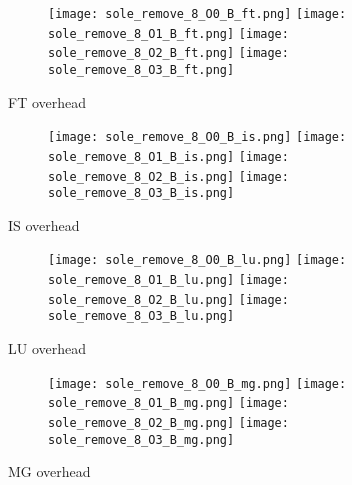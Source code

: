 \documentclass[11pt]{article}
\begin{document}
    \begin{figure}[!htb]
        \begin{subfigure}{\linewidth}
            \texttt{[image: sole\_remove\_8\_O0\_B\_ft.png]}
            \texttt{[image: sole\_remove\_8\_O1\_B\_ft.png]}
            \texttt{[image: sole\_remove\_8\_O2\_B\_ft.png]}
            \texttt{[image: sole\_remove\_8\_O3\_B\_ft.png]}
        \end{subfigure}\par\medskip
        \caption{FT overhead}
    \end{figure}
\begin{figure}[!htb]
        \begin{subfigure}{\linewidth}
            \texttt{[image: sole\_remove\_8\_O0\_B\_is.png]}\hfill
            \texttt{[image: sole\_remove\_8\_O1\_B\_is.png]}\hfill
            \texttt{[image: sole\_remove\_8\_O2\_B\_is.png]}\hfill
            \texttt{[image: sole\_remove\_8\_O3\_B\_is.png]}\hfill
        \end{subfigure}\par\medskip
        \caption{IS overhead}
\end{figure}

    \begin{figure}[!htb]
        \begin{subfigure}{\linewidth}
            \texttt{[image: sole\_remove\_8\_O0\_B\_lu.png]}\hfill
            \texttt{[image: sole\_remove\_8\_O1\_B\_lu.png]}\hfill
            \texttt{[image: sole\_remove\_8\_O2\_B\_lu.png]}\hfill
            \texttt{[image: sole\_remove\_8\_O3\_B\_lu.png]}\hfill
        \end{subfigure}\par\medskip
        \caption{LU overhead}
    \end{figure}

    \begin{figure}[!htb]
        \begin{subfigure}{\linewidth}
            \texttt{[image: sole\_remove\_8\_O0\_B\_mg.png]}\hfill
            \texttt{[image: sole\_remove\_8\_O1\_B\_mg.png]}\hfill
            \texttt{[image: sole\_remove\_8\_O2\_B\_mg.png]}\hfill
            \texttt{[image: sole\_remove\_8\_O3\_B\_mg.png]}\hfill
        \end{subfigure}\par\medskip
        \caption{MG overhead}
    \end{figure}
\end{document}
